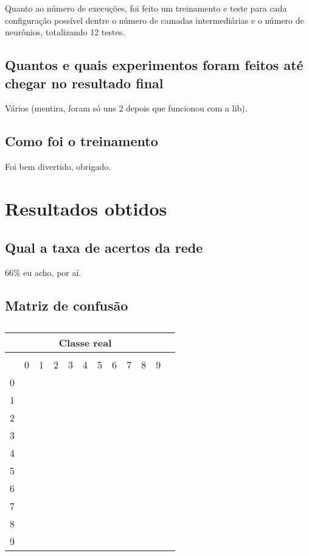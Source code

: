 \documentclass[twocolumn]{article}
\begin{document}
    Quanto ao número de execuções, foi feito um treinamento e teste para cada
    configuração possível dentre o número de camadas intermediárias e o número
    de neurônios, totalizando 12 testes.

    \subsection{Quantos e quais experimentos foram feitos até chegar no resultado final}

    Vários (mentira, foram só uns 2 depois que funcionou com a lib).

    \subsection{Como foi o treinamento}

    Foi bem divertido, obrigado.

    \section{Resultados obtidos}

    \subsection{Qual a taxa de acertos da rede}

    66\% eu acho, por aí.

    \subsection{Matriz de confusão}

    \begin{table}
        \centering
        \begin{tabular}{cccccccccccc}
            \toprule
            \multicolumn{11}{c}{Classe real} \\
            \midrule
            \parbox[t]{2mm}{} \\
            {} & 0 & 1 & 2 & 3 & 4 & 5 & 6 & 7 & 8 & 9 \\
            0  & \\
            1  & \\
            2  & \\
            3  & \\
            4  & \\
            5  & \\
            6  & \\
            7  & \\
            8  & \\
            9  & \\
            \bottomrule
        \end{tabular}
        \caption{\label{}}
    \end{table}
\end{document}
